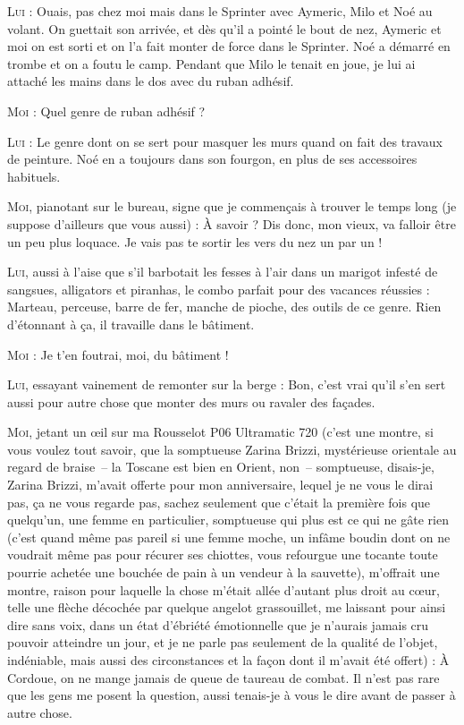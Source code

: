 \begin{dialogue}
\illusloflabel{}%
%
%
\textsc{Lui} : Ouais, pas chez moi mais dans le Sprinter avec Aymeric, Milo et Noé au volant. On guettait son arrivée, et dès qu’il a pointé le bout de nez, Aymeric et moi on est sorti et on l’a fait monter de force dans le Sprinter. Noé a démarré en trombe et on a foutu le camp. Pendant que Milo le tenait en joue, je lui ai attaché les mains dans le dos avec du ruban adhésif.

\textsc{Moi} : Quel genre de ruban adhésif ?

\textsc{Lui} : Le genre dont on se sert pour masquer les murs quand on fait des travaux de peinture. Noé en a toujours dans son fourgon, en plus de ses accessoires habituels.

\textsc{Moi}, pianotant sur le bureau, signe que je commençais à trouver le temps long (je suppose d’ailleurs que vous aussi) : À savoir ? Dis donc, mon vieux, va falloir être un peu plus loquace. Je vais pas te sortir les vers du nez un par un !

\textsc{Lui}, aussi à l’aise que s’il barbotait les fesses à l’air dans un marigot infesté de sangsues, alligators et piranhas, le combo parfait pour des vacances réussies : Marteau, perceuse, barre de fer, manche de pioche, des outils de ce genre. Rien d’étonnant à ça, il travaille dans le bâtiment.

\textsc{Moi} : Je t’en foutrai, moi, du bâtiment !

\textsc{Lui}, essayant vainement de remonter sur la berge : Bon, c’est vrai qu’il s’en sert aussi pour autre chose que monter des murs ou ravaler des façades.

\textsc{Moi}, jetant un œil sur ma Rousselot P06 Ultramatic 720 (c’est une montre, si vous voulez tout savoir, que la somptueuse Zarina Brizzi, mystérieuse orientale au regard de braise~-- la Toscane est bien en Orient, non~-- somptueuse, disais-je, Zarina Brizzi, m’avait offerte pour mon anniversaire, lequel je ne vous le dirai pas, ça ne vous regarde pas, sachez seulement que c’était la première fois que quelqu’un, une femme en particulier, somptueuse qui plus est ce qui ne gâte rien (c’est quand même pas pareil si une femme moche, un infâme boudin dont on ne voudrait même pas pour récurer ses chiottes, vous refourgue une tocante toute pourrie achetée une bouchée de pain à un vendeur à la sauvette), m’offrait une montre, raison pour laquelle la chose m’était allée d’autant plus droit au cœur, telle une flèche décochée par quelque angelot grassouillet, me laissant pour ainsi dire sans voix, dans un état d’ébriété émotionnelle que je n’aurais jamais cru pouvoir atteindre un jour, et je ne parle pas seulement de la qualité de l’objet, indéniable, mais aussi des circonstances et la façon dont il m’avait été offert) : À Cordoue, on ne mange jamais de queue de taureau de combat. Il n’est pas rare que les gens me posent la question, aussi tenais-je à vous le dire avant de passer à autre chose.

\end{dialogue}

